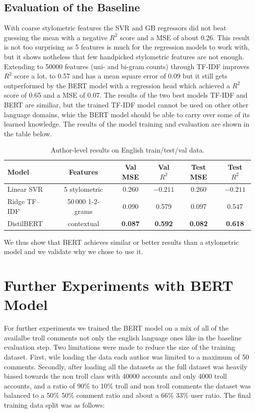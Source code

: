 \documentclass[twoside]{ctuthesis}
\theoremstyle{plain}
\theoremstyle{definition}
\theoremstyle{note}
\begin{document}
\subsection{Evaluation of the Baseline}
With coarse stylometric features the SVR and GB regressors did not beat guessing the mean with a negative $R^2$ score and a MSE of about 0.26. This result is not too surprising as 5 features is much for the regression models to work with, but it shows notheless that few handpicked stylometric features are not enough. Extending to 50000 features (uni- and bi-gram counts) through TF-IDF improves $R^2$ score a lot, to 0.57 and has a mean square error of 0.09 but it still gets outperformed by the BERT model with a regression head which achieved a $R^2$ score of 0.65 and a MSE of 0.07. The results of the two best models TF-IDF and BERT are similiar, but the trained TF-IDF model cannot be used on other other language domains, whie the BERT model should be able to carry over some of its learned knowledge. The results of the model training and evaluation are shown in the table below.\par

\begin{table}[ht]
	\centering
	\caption{Author-level results on English train/test/val data.}
	\label{tab:en_author_results}
	\begin{tabular}{lccccc}
	  \hline
	  \textbf{Model} & \textbf{Features} &
	  \textbf{Val MSE} & \textbf{Val $R^{2}$} &
	  \textbf{Test MSE} & \textbf{Test $R^{2}$} \\
	  \hline
	  Linear SVR & 5 stylometric          & 0.260 & $-0.211$ & 0.260 & $-0.211$ \\
	  Ridge TF--IDF & 50\,000 1-2-grams   & 0.090 & 0.579   & 0.097 & 0.547    \\
	  DistilBERT & contextual   & \textbf{0.087} & \textbf{0.592} &
										   \textbf{0.082} & \textbf{0.618} \\
	  \hline
	\end{tabular}
\end{table}

We thus show that BERT achieves similar or better results than a stylometric model and we validate why we chose to use it.

\section{Further Experiments with BERT Model}

For further experiments we trained the BERT model on a mix of all of the availalbe troll comments not only the english language ones like in the baseline evaluation step. Two limitations were made to reduce the size of the training dataset. First, wile loading the data each author was limited to a maximum of 50 comments. Secondly, after loading all the datasets  as the full dataset was heavily biased towards the non troll class with 40000 accounts and only 4000 troll accounts, and a ratio of 90\% to 10\% troll and non troll comments the dataset was balanced to a 50\% 50\% comment ratio and about a 66\% 33\% user ratio. The final training data split was as follows:
\end{document}
